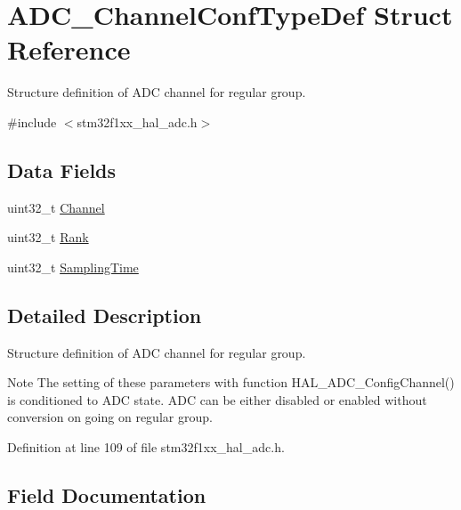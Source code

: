 \hypertarget{struct_a_d_c___channel_conf_type_def}{}\section{A\+D\+C\+\_\+\+Channel\+Conf\+Type\+Def Struct Reference}
\label{struct_a_d_c___channel_conf_type_def}


Structure definition of A\+DC channel for regular group.  




{\ttfamily \#include $<$stm32f1xx\+\_\+hal\+\_\+adc.\+h$>$}

\subsection*{Data Fields}
\begin{DoxyCompactItemize}
\item 
uint32\+\_\+t \hyperlink{struct_a_d_c___channel_conf_type_def_ae82bf9242a014164f9f6907f29782c44}{Channel}
\item 
uint32\+\_\+t \hyperlink{struct_a_d_c___channel_conf_type_def_ab926cc2abe3d17aeaf637d499aef6b1b}{Rank}
\item 
uint32\+\_\+t \hyperlink{struct_a_d_c___channel_conf_type_def_a72e649848c8a14f0adcba783cfb3b2cd}{Sampling\+Time}
\end{DoxyCompactItemize}


\subsection{Detailed Description}
Structure definition of A\+DC channel for regular group. 

\begin{DoxyNote}{Note}
The setting of these parameters with function H\+A\+L\+\_\+\+A\+D\+C\+\_\+\+Config\+Channel() is conditioned to A\+DC state. A\+DC can be either disabled or enabled without conversion on going on regular group. 
\end{DoxyNote}


Definition at line 109 of file stm32f1xx\+\_\+hal\+\_\+adc.\+h.



\subsection{Field Documentation}
\mbox{\label{struct_a_d_c___channel_conf_type_def_ae82bf9242a014164f9f6907f29782c44}} 
